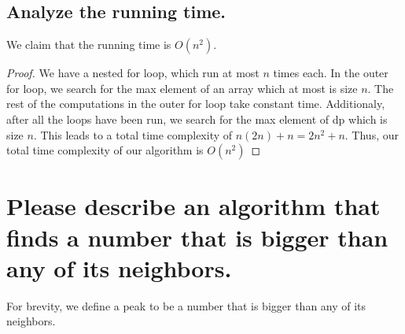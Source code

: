 \documentclass[11pt]{scrartcl}
\begin{document}
\iffalse
	
	\par \textbf{Base Case:} When $k = 0$, fraudMajority halts and returns null which is the correct output
	because the collection is empty. Hence, $P(0)$ holds.
	\par \textbf{Inductive step:} Suppose $P(n)$ holds for all $n \leq k \in \mathbb{N}$. We show that $P(k+1)$ holds.
	\par We observe that fraudMajority recursively calls collections of sizes $\floor{(k+1)/2}$ and
	$(k+1) - \floor{(k+1)/2}$.
	Since $\floor{(k+1)/2} \leq k$ and $(k+1) - \floor{(k+1)/2} \leq k $, we know by our strong inductive hypothesis that these
	recursive calls must halt. Hence, fraudMajority halts with an input of $k+1$ cards.
	\par fraudMajority finds the majority card of its left and right side, of size $\floor{(k+1)/2}$ and
	$(k+1) - \floor{(k+1)/2}$ respectively. Since both of these collections are less than $k$, by our strong inductive hypothesis,
	these recursive calls must return the correct output, the majority card of that partition if it exists.
	Then our algorithm calculates the total number of the majority card on the right and left on our
	$k+1$ collection and returns the majority. If no majority exists, it returns null. Thus,
	fraudMajority returns the correct output for a collection of $k+1$ cards.

	\par By strong induction, we have proven that $P(n)$ is true for all $n \in \mathbb{N}$.
	Therefore, fraudMajority is correct.
\fi


\subsection{
	Analyze the running time.
}
We claim that the running time is $O(n^2)$.
\begin{proof}
	We have a nested for loop, which run at most $n$ times each.
	In the outer for loop, we search for the max element of an array
	which at most is size $n$. The rest of the computations in the outer for loop take constant time.
	Additionaly, after all the loops have been run, we search for the max element of dp which is
	size $n$. This leads to a total time complexity of $n(2n) + n = 2n^2 + n$.
	Thus, our total time complexity of our algorithm is $O(n^2)$
\end{proof}



\section{Please describe an algorithm that finds a number that is
  bigger than any of its neighbors.}
For brevity, we define a peak to be a number that is
bigger than any of its neighbors.
\end{document}
